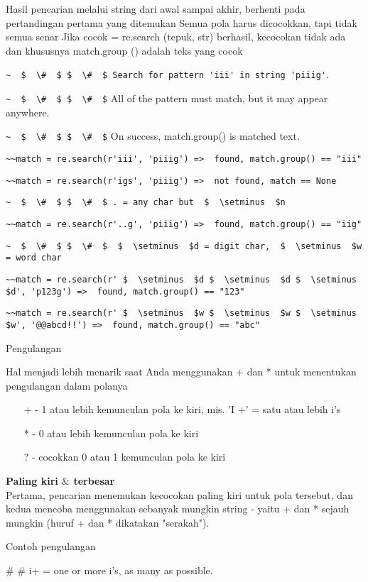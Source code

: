 \begin{enumerate}
\begin{enumerate}
Hasil pencarian melalui string dari awal sampai akhir, berhenti pada pertandingan pertama yang ditemukan  Semua pola harus dicocokkan, tapi tidak semua senar Jika cocok = re.search (tepuk, str) berhasil, kecocokan tidak ada dan khususnya match.group () adalah teks yang cocok

\verb|~  $  \#  $ $  \#  $ Search for pattern 'iii' in string 'piiig'|.

\verb|~  $  \#  $ $  \#  $| All of the pattern must match, but it may appear anywhere.

\verb|~  $  \#  $ $  \#  $| On success, match.group() is matched text.

\verb|~~match = re.search(r'iii', 'piiig') =>  found, match.group() == "iii"|

\verb|~~match = re.search(r'igs', 'piiig') =>  not found, match == None|

\verb|~  $  \#  $ $  \#  $ . = any char but  $  \setminus  $n|

\verb|~~match = re.search(r'..g', 'piiig') =>  found, match.group() == "iig"|

\verb|~  $  \#  $ $  \#  $  $  \setminus  $d = digit char,  $  \setminus  $w = word char|

\verb|~~match = re.search(r' $  \setminus  $d $  \setminus  $d $  \setminus  $d', 'p123g') =>  found, match.group() == "123"|

\verb|~~match = re.search(r' $  \setminus  $w $  \setminus  $w $  \setminus  $w', '@@abcd!!') =>  found, match.group() == "abc"|

Pengulangan

Hal menjadi lebih menarik saat Anda menggunakan + dan * untuk menentukan pengulangan dalam polanya

~~~ + - 1 atau lebih kemunculan pola ke kiri, mis. 'I +' = satu atau lebih i's

~~~ * - 0 atau lebih kemunculan pola ke kiri

~~~ ? - cocokkan 0 atau 1 kemunculan pola ke kiri

{\fontsize{14pt}{14pt}\selectfont \textbf{Paling kiri  $  \&  $ terbesar} \\}
Pertama, pencarian menemukan kecocokan paling kiri untuk pola tersebut, dan kedua mencoba menggunakan sebanyak mungkin string - yaitu + dan * sejauh mungkin (huruf + dan * dikatakan "serakah").

Contoh pengulangan

 $  \#  $ $  \#  $ i+ = one or more i's, as many as possible.


\end{enumerate}
\end{enumerate}
